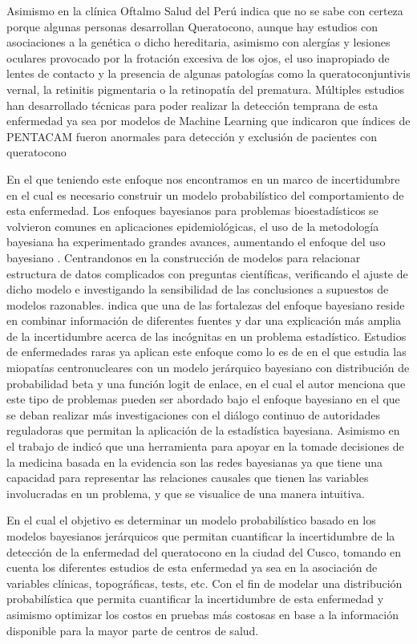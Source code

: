 Asimismo en la clínica Oftalmo Salud del Perú indica que no se sabe con certeza porque algunas personas desarrollan Queratocono, aunque hay estudios con asociaciones a la genética o dicho hereditaria, asimismo con alergías y lesiones oculares provocado por la frotación excesiva de los ojos, el uso inapropiado de lentes de contacto y la presencia de algunas patologías como la queratoconjuntivis vernal, la retinitis pigmentaria o la retinopatía del prematura. Múltiples estudios han desarrollado técnicas para poder realizar la detección temprana de esta enfermedad ya sea por modelos de Machine Learning que indicaron que índices de PENTACAM fueron anormales para detección y exclusión de pacientes con queratocono \cite{zhao2024evaluation}

En el que teniendo este enfoque nos encontramos en un marco de incertidumbre en el cual es necesario construir un modelo probabilístico del comportamiento de esta enfermedad. Los enfoques bayesianos para problemas bioestadísticos se volvieron comunes en aplicaciones epidemiológicas, el uso de la metodología bayesiana ha experimentado grandes avances, aumentando el enfoque del uso bayesiano \cite{lawson2018bayesian}. Centrandonos en la construcción de modelos para relacionar estructura de datos complicados con preguntas científicas, verificando el ajuste de dicho modelo e investigando la sensibilidad de las conclusiones a supuestos de modelos razonables. \cite{Gelman_2013} indica que una de las fortalezas del enfoque bayesiano reside en combinar información de diferentes fuentes y dar una explicación más amplia de la incertidumbre acerca de las incógnitas en un problema estadístico.
Estudios de enfermedades raras ya aplican este enfoque como lo es de \cite{fouarge2021hierarchical} en el que estudia las miopatías centronucleares con un modelo jerárquico bayesiano con distribución de probabilidad beta y una función logit de enlace, en el cual el autor menciona que este tipo de problemas pueden ser abordado bajo el enfoque bayesiano en el que se deban realizar más investigaciones con el diálogo continuo de autoridades reguladoras que permitan la aplicación de la estadística bayesiana. Asimismo en el trabajo de \cite{ferez2017redes} indicó que una herramienta para apoyar en la tomade decisiones de la medicina basada en la evidencia son las redes bayesianas ya que tiene una capacidad para representar las relaciones causales que tienen las variables involucradas en un problema, y que se visualice de una manera intuitiva.

En el cual el objetivo es determinar un modelo probabilístico basado en los modelos bayesianos jerárquicos que permitan cuantificar la incertidumbre de la detección de la enfermedad del queratocono en la ciudad del Cusco, tomando en cuenta los diferentes estudios de esta enfermedad ya sea en la asociación de variables clínicas, topográficas, tests, etc. Con el fin de modelar una distribución probabilística que permita cuantificar la incertidumbre de esta enfermedad y asimismo optimizar los costos en pruebas más costosas en base a la información disponible para la mayor parte de centros de salud.

